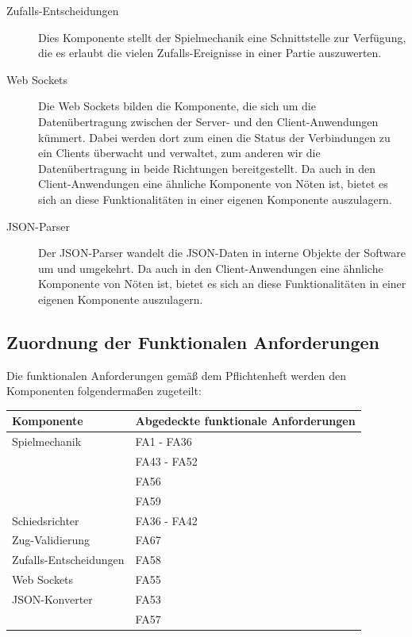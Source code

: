 \begin{description}
			\item[Zufalls-Entscheidungen]
			Dies Komponente stellt der Spielmechanik eine Schnittstelle zur Verfügung, die es erlaubt die vielen Zufalls-Ereignisse in einer Partie auszuwerten.
			
			\item[Web Sockets]
			Die Web Sockets bilden die Komponente, die sich um die Datenübertragung zwischen der Server- und den Client-Anwendungen kümmert. Dabei werden dort zum einen die Status der Verbindungen zu ein Clients überwacht und verwaltet, zum anderen wir die Datenübertragung in beide Richtungen bereitgestellt. Da auch in den Client-Anwendungen eine ähnliche Komponente von Nöten ist, bietet es sich an diese Funktionalitäten in einer eigenen Komponente auszulagern.
			
			\item[JSON-Parser]
			Der JSON-Parser wandelt die JSON-Daten in interne Objekte der Software um und umgekehrt. Da auch in den Client-Anwendungen eine ähnliche Komponente von Nöten ist, bietet es sich an diese Funktionalitäten in einer eigenen Komponente auszulagern.  

		\end{description}
		
	\subsection{Zuordnung der Funktionalen Anforderungen}
	
	Die funktionalen Anforderungen gemäß dem Pflichtenheft werden den Komponenten folgendermaßen zugeteilt:

	\begin{tabular}{|l|l|}
		\hline
		\textbf{Komponente} & \textbf{Abgedeckte funktionale Anforderungen}\\ \hline
		Spielmechanik & FA1 - FA36 \\
		& FA43 - FA52 \\
		& FA56 \\
		& FA59 \\ \hline
		
		Schiedsrichter & FA36 - FA42 \\ \hline
		
		Zug-Validierung & FA67 \\ \hline
		
		Zufalls-Entscheidungen & FA58 \\ \hline	
		
		Web Sockets & FA55 \\ \hline
		
		JSON-Konverter & FA53 \\
		& FA57\\ \hline

	
\end{tabular}